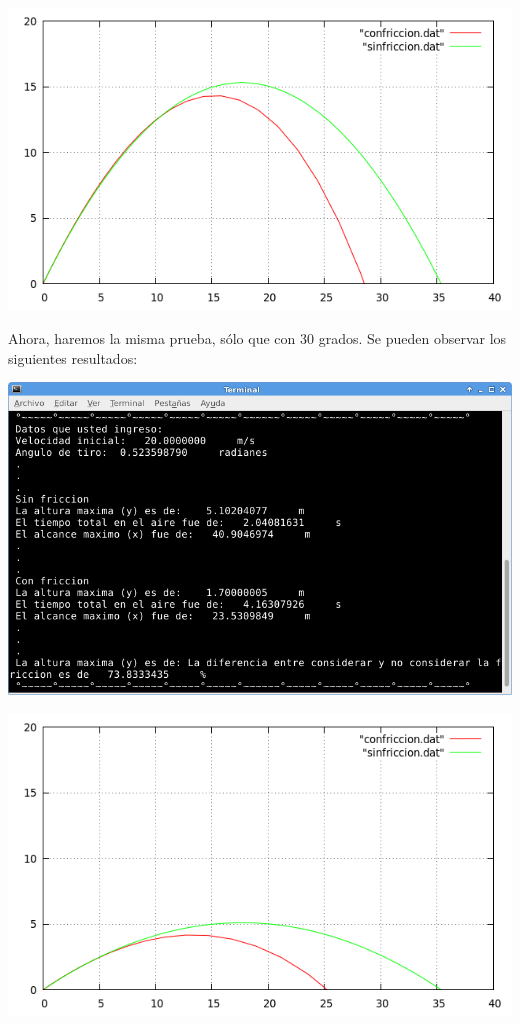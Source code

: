\documentclass[12pt]{article}
\begin{document}
\begin{center}
\includegraphics[width=15cm]{graf60.png}\\
\end{center}

Ahora, haremos la misma prueba, sólo que con 30 grados. Se pueden observar los siguientes resultados:


\begin{center}
\includegraphics[width=15cm]{resul30.png}\\
\end{center}


\begin{center}
\includegraphics[width=15cm]{graf30.png}\\
\end{center}
\end{document}
